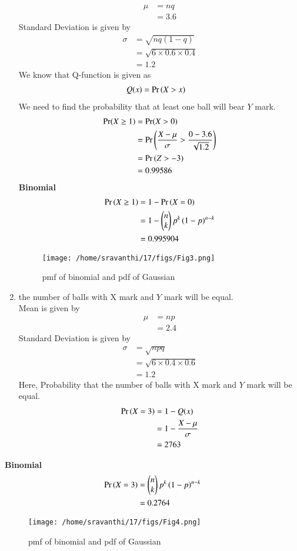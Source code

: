 \documentclass[journal,12pt,twocolumn]{IEEEtran}
\theoremstyle{remark}
\begin{document}
\begin{enumerate}
\begin{align}
	\mu &= nq \\
	&= 3.6
\end{align}
Standard Deviation is given by
\begin{align}
	\sigma &= \sqrt{nq(1 - q)}\\
	&= \sqrt{6 \times 0.6 \times 0.4}\\
	&=  1.2
\end{align}
We know that Q-function is given as\\
\begin{align}
Q(x) &= \Pr\left(X > x\right)
\end{align}
We need to find the probability that at least one ball will bear $Y$ mark.
\begin{align}
	\Pr(X \geq 1) &=\Pr(X > 0)\\
	&= \Pr\left(\frac{X - \mu}{\sigma} > \frac{0 - 3.6}{\sqrt{1.2}}\right) \\
	&=\Pr\left(Z > -3\right) \\
	&=0.99586\\
\end{align}
\textbf{Binomial}
\begin{align}
\Pr\left(X\ge 1\right) &= 1 - \Pr\left(X=0\right) \\
&= 1-\begin{pmatrix}n\\k\end{pmatrix}p^k\left(1-p\right)^{n-k} \\
&=0.995904 
\end{align}
\begin{figure}
\texttt{[image: /home/sravanthi/17/figs/Fig3.png]}
\caption{pmf of binomial and pdf of Gaussian }
\label{fig:gaussian/9/3/17/}
\end{figure}
\item the number of balls with X mark and $Y$ mark will be equal.\\
Mean is given by
\begin{align}
	\mu &= np \\
	&= 2.4
\end{align}
Standard Deviation is given by
\begin{align}
	\sigma &= \sqrt{npq}\\
	&= \sqrt{6 \times 0.4 \times 0.6}\\
	&=  1.2
\end{align}
Here, Probability that the number of balls with X mark and $Y$ mark will be equal.
\begin{align}
\Pr\left(X = 3\right) &= 1 - Q(x)\\
 &= 1-\frac{X - \mu}{\sigma} \\
	&= 2763\\        
\end{align}
\end{enumerate}
\textbf{Binomial}
\begin{align}
\Pr\left(X=3\right) 
&=\begin{pmatrix}n\\k\end{pmatrix}p^k\left(1-p\right)^{n-k} \\
&= 0.2764
\end{align}
\begin{figure}
\texttt{[image: /home/sravanthi/17/figs/Fig4.png]}
\caption{pmf of binomial and pdf of Gaussian }
\label{fig:gaussian/9/3/17/}
\end{figure}
\end{document}
